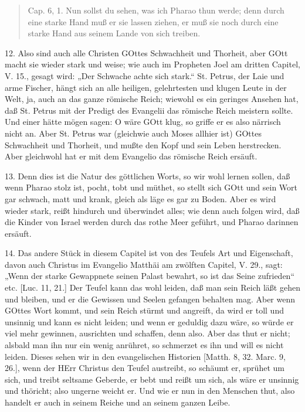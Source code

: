 \begin{quote}
Cap. 6, 1. Nun sollst du sehen, was ich Pharao thun werde; denn durch eine starke Hand muß er sie lassen ziehen, er muß sie noch durch eine starke Hand aus seinem Lande von sich treiben.
\end{quote}

12. Also sind auch alle Christen GOttes Schwachheit und Thorheit, aber GOtt macht sie wieder stark und weise; wie auch im Propheten Joel am dritten Capitel, V. 15., gesagt wird: „Der Schwache achte sich stark.“ St. Petrus, der Laie und arme Fischer, hängt sich an alle heiligen, gelehrtesten und klugen Leute in der Welt, ja, auch an das ganze römische Reich; wiewohl es ein geringes Ansehen hat, daß St. Petrus mit der Predigt des Evangelii das römische Reich meistern sollte. Und einer hätte mögen sagen: O wäre GOtt klug, so griffe er es also närrisch nicht an. Aber St. Petrus war (gleichwie auch Moses allhier ist) GOttes Schwachheit und Thorheit, und mußte den Kopf und sein Leben herstrecken. Aber gleichwohl hat er mit dem Evangelio das römische Reich ersäuft.

13. Denn dies ist die Natur des göttlichen Worts, so wir wohl lernen sollen, daß wenn Pharao stolz ist, pocht, tobt und müthet, so stellt sich GOtt und sein Wort gar schwach, matt und krank, gleich als läge es gar zu Boden. Aber es wird wieder stark, reißt hindurch und überwindet alles; wie denn auch folgen wird, daß die Kinder von Israel werden durch das rothe Meer geführt, und Pharao darinnen ersäuft.

14. Das andere Stück in diesem Capitel ist von des Teufels Art und Eigenschaft, davon auch Christus im Evangelio Matthäi am zwölften Capitel, V. 29., sagt: „Wenn der starke Gewappnete seinen Palast bewahrt, so ist das Seine zufrieden“ etc. [Luc. 11, 21.] Der Teufel kann das wohl leiden, daß man sein Reich läßt gehen und bleiben, und er die Gewissen und Seelen gefangen behalten mag. Aber wenn GOttes Wort kommt, und sein Reich stürmt und angreift, da wird er toll und unsinnig und kann es nicht leiden; und wenn er geduldig dazu wäre, so würde er viel mehr gewinnen, ausrichten und schaffen, denn also. Aber das thut er nicht; alsbald man ihn nur ein wenig anrühret, so schmerzet es ihn und will es nicht leiden. Dieses sehen wir in den evangelischen Historien [Matth. 8, 32. Marc. 9, 26.], wenn der HErr Christus den Teufel austreibt, so schäumt er, sprühet um sich, und treibt seltsame Geberde, er bebt und reißt um sich, als wäre er unsinnig und thöricht; also ungerne weicht er. Und wie er nun in den Menschen thut, also handelt er auch in seinem Reiche und an seinem ganzen Leibe.


